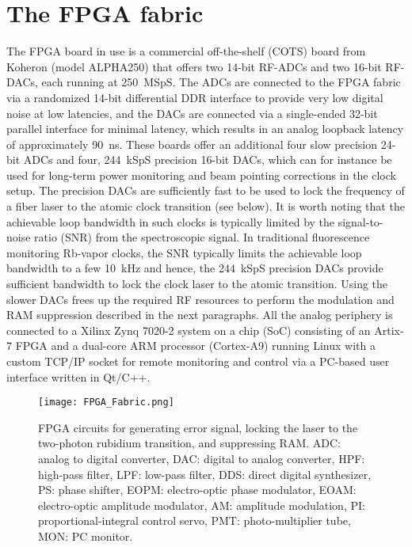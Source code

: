 \documentclass[aip,graphicx]{revtex4-2}
\begin{document}
	\section{The FPGA fabric}
	The FPGA board in use is a commercial off-the-shelf (COTS) board from Koheron (model ALPHA250) that offers two 14-bit RF-ADCs and two 16-bit RF-DACs, each running at 250~MSpS. The ADCs are connected to the FPGA fabric via a randomized 14-bit differential DDR interface to provide very low digital noise at low latencies, and the DACs are connected via a single-ended 32-bit parallel interface for minimal latency, which results in an analog loopback latency of approximately 90~ns. These boards offer an additional four slow precision 24-bit ADCs and four, 244~kSpS precision 16-bit DACs, which can for instance be used for long-term power monitoring and beam pointing corrections in the clock setup. The precision DACs are sufficiently fast to be used to lock the frequency of a fiber laser to the atomic clock transition (see below). It is worth noting that the achievable loop bandwidth in such clocks is typically limited by the signal-to-noise ratio (SNR) from the spectroscopic signal. In traditional fluorescence monitoring Rb-vapor clocks, the SNR typically limits the achievable loop bandwidth to a few 10~kHz and hence, the 244~kSpS precision DACs provide sufficient bandwidth to lock the clock laser to the atomic transition. Using the slower DACs frees up the required RF resources to perform the modulation and RAM suppression described in the next paragraphs. All the analog periphery is connected to a Xilinx Zynq 7020-2 system on a chip (SoC) consisting of an Artix-7 FPGA and a dual-core ARM processor (Cortex-A9) running Linux with a custom TCP/IP socket for remote monitoring and control via a PC-based user interface written in Qt/C++.
	
	\begin{figure}
		\centering\texttt{[image: FPGA\_Fabric.png]}
		\caption{\label{fig:FPGA_Fabric} FPGA circuits for generating error signal, locking the laser to the two-photon rubidium transition, and suppressing RAM. ADC: analog to digital converter, DAC: digital to analog converter, HPF: high-pass filter, LPF: low-pass filter, DDS: direct digital synthesizer, PS: phase shifter, EOPM: electro-optic phase modulator, EOAM: electro-optic amplitude modulator, AM: amplitude modulation, PI: proportional-integral control servo, PMT: photo-multiplier tube, MON: PC monitor.}
	\end{figure}
	
\end{document}
